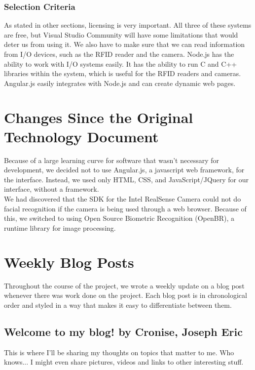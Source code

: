 \documentclass[10pt, onecolumn, twoside, peerreview]{IEEEtran}
\begin{document}
\subsubsection{Selection Criteria}
As stated in other sections, licensing is very important. All three of these systems are free, but Visual Studio
Community will have some limitations that would deter us from using it. We also have to make sure that we can read
information from I/O devices, such as the RFID reader and the camera. Node.js has the ability to work with I/O systems
easily. It has the ability to run C and C++ libraries within the system, which is useful for the RFID readers and
cameras. Angular.js easily integrates with Node.js and can create dynamic web pages.

\section{Changes Since the Original Technology Document}
Because of a large learning curve for software that wasn't necessary for development, we decided not to use Angular.js, a javascript web framework, for the interface. Instead, we used only HTML, CSS, and JavaScript/JQuery for our interface, without a framework.\\

We had discovered that the SDK for the Intel RealSense Camera could not do facial recognition if the camera is being used through a web browser. Because of this, we switched to using Open Source Biometric Recognition (OpenBR), a runtime library for image processing.\\

\section{Weekly Blog Posts}
Throughout the course of the project, we wrote a weekly update on a blog post whenever there was work done on the project. Each blog post is in chronological order and styled in a way that makes it easy to differentiate between them.

\subsection{Welcome to my blog! by Cronise, Joseph Eric}
This is where I'll be sharing my thoughts on topics that matter to me. Who knows... I might even share pictures, videos and links to other interesting stuff.\\
\end{document}
